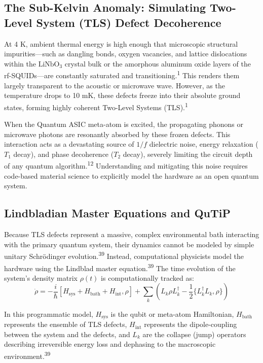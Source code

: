 \documentclass[11pt, a4paper]{article}
\begin{document}
\subsection{The Sub-Kelvin Anomaly: Simulating Two-Level System (TLS) Defect Decoherence}

At 4 K, ambient thermal energy is high enough that microscopic structural impurities---such as dangling bonds, oxygen vacancies, and lattice dislocations within the $\text{LiNbO}_3$ crystal bulk or the amorphous aluminum oxide layers of the rf-SQUIDs---are constantly saturated and transitioning.\textsuperscript{1} This renders them largely transparent to the acoustic or microwave wave. However, as the temperature drops to 10 mK, these defects freeze into their absolute ground states, forming highly coherent Two-Level Systems (TLS).\textsuperscript{1}

When the Quantum ASIC meta-atom is excited, the propagating phonons or microwave photons are resonantly absorbed by these frozen defects. This interaction acts as a devastating source of $1/f$ dielectric noise, energy relaxation ($T_1$ decay), and phase decoherence ($T_2$ decay), severely limiting the circuit depth of any quantum algorithm.\textsuperscript{12} Understanding and mitigating this noise requires code-based material science to explicitly model the hardware as an open quantum system.

\subsection{Lindbladian Master Equations and QuTiP}

Because TLS defects represent a massive, complex environmental bath interacting with the primary quantum system, their dynamics cannot be modeled by simple unitary Schr\"odinger evolution.\textsuperscript{39} Instead, computational physicists model the hardware using the Lindblad master equation.\textsuperscript{39} The time evolution of the system's density matrix $\rho(t)$ is computationally tracked as:
\begin{equation}
\dot{\rho} = -\frac{i}{\hbar}[H_{\text{sys}} + H_{\text{bath}} + H_{\text{int}}, \rho] + \sum_k \left( L_k \rho L_k^\dagger - \frac{1}{2}\{L_k^\dagger L_k, \rho\} \right)
\end{equation}

In this programmatic model, $H_{\text{sys}}$ is the qubit or meta-atom Hamiltonian, $H_{\text{bath}}$ represents the ensemble of TLS defects, $H_{\text{int}}$ represents the dipole-coupling between the system and the defects, and $L_k$ are the collapse (jump) operators describing irreversible energy loss and dephasing to the macroscopic environment.\textsuperscript{39}
\end{document}
